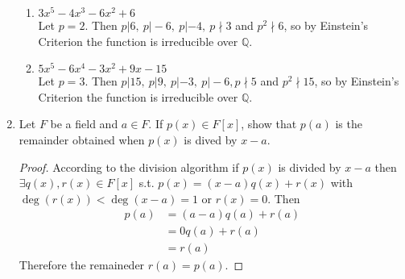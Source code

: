 \documentclass[12pt]{article}
\newcommand\setitemnumber[1]{\setcounter{enumi}{\numexpr#1-- -1\relax}}
\begin{document}
\begin{enumerate}[label=\textbf{\arabic*}.]
\begin{enumerate}
              \item $3x^5-4x^3-6x^2+6$ \\
              Let $p = 2$. Then $p|6, \ p|-6, \ p|-4, \ p\nmid 3$ and $p^2\nmid 6$, so by Einstein's Criterion 
              the function is irreducible over $\mathbb{Q}$.
              
              \item $5x ^5-6x^4-3x^2+9x-15$ \\
              Let $p = 3$. Then $p|15, \ p|9, \ p|-3, \ p|-6, p\nmid 5$ and $p^2\nmid 15$, so by Einstein's 
              Criterion the function is irreducible over $\mathbb{Q}$.
          \end{enumerate}
          \setitemnumber{17}
          \item Let $F$ be a field and $a \in F$. If $p(x) \in F[x]$, show that $p(a)$ is the remainder obtained 
          when $p(x)$ is dived by $x-a$.
          \begin{proof}
              According to the division algorithm if $p(x)$ is divided by $x-a$ then \\
              $\exists q(x),r(x) \in F[x]$ s.t. $p(x) = (x-a)q(x) + r(x)$ with \\
              $\deg(r(x)) < \deg(x-a) = 1$ or $r(x) = 0$. Then 
              \begin{align*}
                  p(a) &= (a-a)q(a) + r(a) \\
                  &= 0q(a) + r(a) \\
                  &= r(a)
              \end{align*}
              Therefore the remaineder $r(a) = p(a)$.
          \end{proof}

\end{enumerate}
\end{document}
